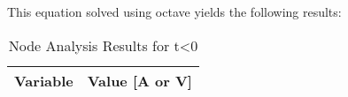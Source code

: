 This equation solved using octave yields the following results:

\begin{table}[H]
    \centering
    \begin{tabular}{|l|r|}
      \hline    
      {\bf Variable} & {\bf Value [A or V]} \\ \hline
    \end{tabular}
    \caption{Node Analysis Results for t<0}
    \label{tab:nodeanalysist<0}
  \end{table}


